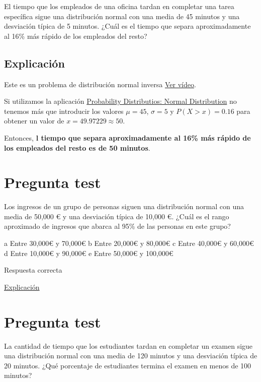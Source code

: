 \documentclass[
]{book}
\begin{document}
El tiempo que los empleados de una oficina tardan en completar una tarea específica sigue una distribución normal con una media de 45 minutos y una desviación típica de 5 minutos. ¿Cuál es el tiempo que separa aproximadamente al 16\% más rápido de los empleados del resto?

\hypertarget{explicaciuxf3n}{%
\subsection{Explicación}\label{explicaciuxf3n}}

Este es un problema de distribución normal inversa \href{https://youtu.be/BqGHUqC4cdQ}{Ver vídeo}.

Si utilizamos la aplicación \href{https://homepage.divms.uiowa.edu/~mbognar/applets/normal.html}{Probability Distributios: Normal Distribution} no tenemos más que introducir los valores \(\mu = 45\), \(\sigma = 5\) y \(P(X > x)= 0.16\) para obtener un valor de \(x = 49.97229 \approx 50\).

Entonces, \textbf{l tiempo que separa aproximadamente al 16\% más rápido de los empleados del resto es de 50 minutos}.

\hypertarget{pregunta-test-106}{%
\section{Pregunta test}\label{pregunta-test-106}}

Los ingresos de un grupo de personas siguen una distribución normal con una media de 50,000 € y una desviación típica de 10,000 €. ¿Cuál es el rango aproximado de ingresos que abarca al 95\% de las personas en este grupo?

a Entre 30,000€ y 70,000€
b Entre 20,000€ y 80,000€
c Entre 40,000€ y 60,000€
d Entre 10,000€ y 90,000€
e Entre 50,000€ y 100,000€

Respuesta correcta

\href{https://youtu.be/TjZvZVxItLc}{Explicación}

\hypertarget{pregunta-test-107}{%
\section{Pregunta test}\label{pregunta-test-107}}

La cantidad de tiempo que los estudiantes tardan en completar un examen sigue una distribución normal con una media de 120 minutos y una desviación típica de 20 minutos. ¿Qué porcentaje de estudiantes termina el examen en menos de 100 minutos?
\end{document}
